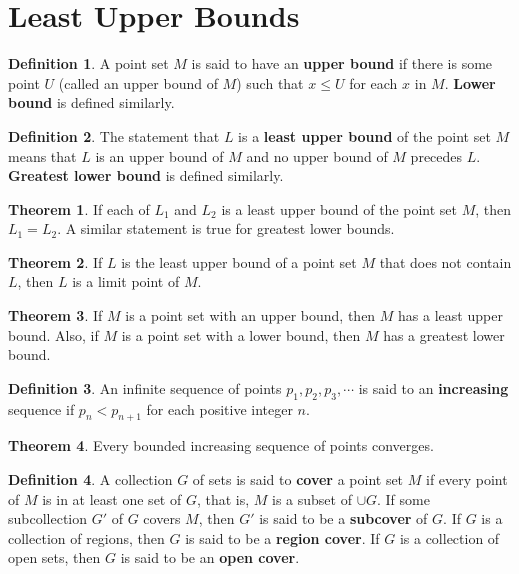 \documentclass{article}
\theoremstyle{definition}
\newtheorem{definition}{Definition}
\newtheorem{theorem}{Theorem}
\theoremstyle{definition}
\theoremstyle{plain}
\begin{document}
\section*{Least Upper Bounds}

\begin{definition}
  A point set $M$ is said to have an \textbf{upper bound} if there is some
  point $U$ (called an upper bound of $M$) such that $x \leq U$ for each $x$ in
  $M$.  \textbf{Lower bound} is defined similarly.
\end{definition}

\begin{definition}
  The statement that $L$ is a \textbf{least upper bound} of the point set $M$
  means that $L$ is an upper bound of $M$ and no upper bound of $M$ precedes
  $L$.  \textbf{Greatest lower bound} is defined similarly.
\end{definition}

\begin{theorem}
  If each of $L_1$ and $L_2$ is a least upper bound of the point set $M$, then
  $L_1 = L_2$.  A similar statement is true for greatest lower bounds.
\end{theorem}

\begin{theorem}
  If $L$ is the least upper bound of a point set $M$ that does not contain $L$,
  then $L$ is a limit point of $M$.
\end{theorem}

\begin{theorem}
  If $M$ is a point set with an upper bound, then $M$ has a least upper bound.
  Also, if $M$ is a point set with a lower bound, then $M$ has a greatest lower
  bound.
\end{theorem}

\begin{definition}
  An infinite sequence of points $p_1, p_2, p_3, \cdots$ is said to an
  \textbf{increasing} sequence if $p_n < p_{n+1}$ for each positive integer
  $n$.
\end{definition}

\begin{theorem}
  Every bounded increasing sequence of points converges.
\end{theorem}

\begin{definition}
  A collection $G$ of sets is said to \textbf{cover} a point set $M$ if every
  point of $M$ is in at least one set of $G$, that is, $M$ is a subset of $\cup
  G$.  If some subcollection $G'$ of $G$ covers $M$, then $G'$ is said to be a
  \textbf{subcover} of $G$.  If $G$ is a collection of regions, then $G$ is
  said to be a \textbf{region cover}.  If $G$ is a collection of open sets,
  then $G$ is said to be an \textbf{open cover}.
\end{definition}
\end{document}
